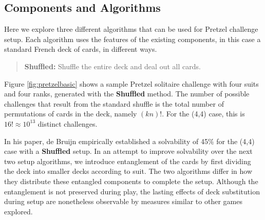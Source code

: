 \documentclass[journal]{IEEEtran}
\begin{document}
\subsection{Components and Algorithms}
\noindent
Here we explore three different algorithms that can be used for Pretzel challenge setup. Each algorithm uses the features of the existing components, in this case a standard French deck of cards, in different ways.

\begin{quote}
    {\bf Shuffled:} Shuffle the entire deck and deal out all cards.
\end{quote}

Figure \ref{fig:pretzelbasic} shows a sample Pretzel solitaire challenge with four suits and four ranks, generated with the \textbf{Shuffled} method.
The number of possible challenges that result from the standard shuffle is the total number of permutations of cards in the deck, namely $(kn)!$. For the (4,4) case, this is $16! \approx 10^{13}$ distinct challenges.

In his paper, de Bruijn empirically established a solvability of 45\% for the (4,4) case with a \textbf{Shuffled} setup. In an attempt to improve solvability over the next two setup algorithms, we introduce entanglement of the cards by first dividing the deck into smaller decks according to suit. The two algorithms differ in how they distribute these entangled components to complete the setup. Although the entanglement is not preserved during play, the lasting effects of deck substitution during setup are nonetheless observable by measures similar to other games explored.



\end{document}

